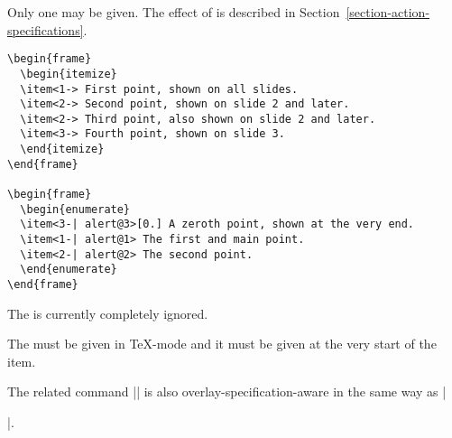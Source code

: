 \begin{command}{\item{}}
  \beamernote
  Only one  may be given. The effect of  is described in Section~\ref{section-action-specifications}.

  \example
\begin{verbatim}
\begin{frame}
  \begin{itemize}
  \item<1-> First point, shown on all slides.
  \item<2-> Second point, shown on slide 2 and later.
  \item<2-> Third point, also shown on slide 2 and later.
  \item<3-> Fourth point, shown on slide 3.
  \end{itemize}
\end{frame}

\begin{frame}
  \begin{enumerate}
  \item<3-| alert@3>[0.] A zeroth point, shown at the very end.
  \item<1-| alert@1> The first and main point.
  \item<2-| alert@2> The second point.
  \end{enumerate}
\end{frame}
\end{verbatim}

  \articlenote
  The  is currently completely ignored.

  \lyxnote
  The  must be given in \TeX-mode and it must be given at the very start of the item.
\end{command}

The related command |\bibitem| is also overlay-specification-aware in the same way as |\item|.

